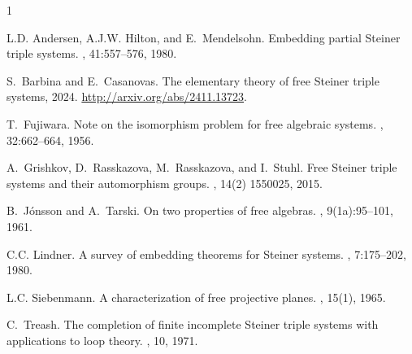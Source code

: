 \documentclass[10pt,a4paper]{article}
\theoremstyle{note}
\begin{document}
\begin{thebibliography}{1}

L.D. Andersen, A.J.W. Hilton, and E.~Mendelsohn.
\newblock Embedding partial {S}teiner triple systems.
, 41:557--576,
  1980.

S.~Barbina and E.~Casanovas.
\newblock The elementary theory of free {S}teiner triple systems, 2024.
\newblock \url{http://arxiv.org/abs/2411.13723}.

T.~Fujiwara.
\newblock Note on the isomorphism problem for free algebraic systems.
, 32:662--664, 1956.

A.~Grishkov, D.~Rasskazova, M.~Rasskazova, and I.~Stuhl.
\newblock Free Steiner triple systems and their automorphism groups.
, 14(2) 1550025, 2015.

B.~J\'onsson and A.~Tarski.
\newblock On two properties of free algebras.
, 9(1a):95--101, 1961.

C.C. Lindner.
\newblock A survey of embedding theorems for {S}teiner systems.
, 7:175--202, 1980.

L.C. Siebenmann.
\newblock A characterization of free projective planes.
, 15(1), 1965.

C.~Treash.
\newblock The completion of finite incomplete {S}teiner triple systems with
  applications to loop theory.
, 10, 1971.

\end{thebibliography}
\end{document}

